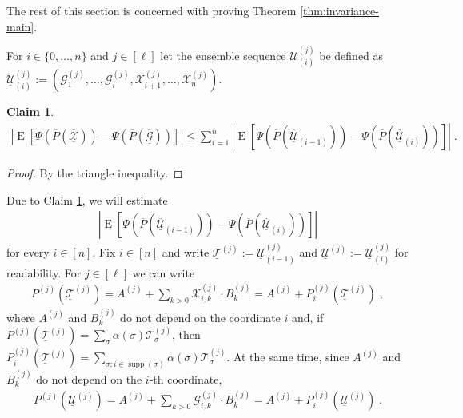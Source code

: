 \documentclass{daj}
\newcommand{\1}{\mathbbm{1}}
\theoremstyle{plain}
\newtheorem{claim}[theorem]{Claim}
\theoremstyle{definition}
\DeclareMathOperator*{\EE}{E}
\DeclareMathOperator*{\supp}{supp}
\begin{document}
The rest of this section is concerned with proving Theorem 
\ref{thm:invariance-main}.

For $i \in \{0, \ldots, n\}$ and $j \in [\ell]$ let the ensemble sequence 
$\underline{\mathcal{U}}_{(i)}^{(j)}$ be
defined as $\underline{\mathcal{U}}_{(i)}^{(j)} := 
(\mathcal{G}_1^{(j)}, \ldots, \mathcal{G}_i^{(j)}, 
\mathcal{X}_{i+1}^{(j)}, \ldots, \mathcal{X}_n^{(j)})$.

\begin{claim}
\label{cl:invariance-triangle-inequality}
\begin{align*}
\left| \EE \left[
	\Psi(\overline{P}(\overline{\underline{\mathcal{X}}}))
	- \Psi(\overline{P}(\overline{\underline{\mathcal{G}}}))
	\right] \right|
  \le
\sum_{i=1}^n \left| \EE \left[
	\Psi(\overline{P}(\overline{\underline{\mathcal{U}}}_{(i-1)}))
	- \Psi(\overline{P}(\overline{\underline{\mathcal{U}}}_{(i)}))
	\right] \right| \; .
\end{align*}
\end{claim}

\begin{proof}
By the triangle inequality.
\end{proof}

Due to Claim 
\ref{cl:invariance-triangle-inequality}, we will estimate
\begin{align*}
\left| \EE \left[
	\Psi(\overline{P}(\overline{\underline{\mathcal{U}}}_{(i-1)}))
	- \Psi(\overline{P}(\overline{\underline{\mathcal{U}}}_{(i)}))
	\right] \right| 
\end{align*}
for every $i \in [n]$. Fix $i \in [n]$ and write
$\underline{\mathcal{T}}^{(j)} := \underline{\mathcal{U}}_{(i-1)}^{(j)}$ and
$\underline{\mathcal{U}}^{(j)} := \underline{\mathcal{U}}_{(i)}^{(j)}$ for 
readability.
For $j \in [\ell]$ we can write
\begin{align}
\label{eq:62a}
  P^{(j)}(\underline{\mathcal{T}}^{(j)}) =
  A^{(j)} + \sum_{k>0} \mathcal{X}_{i,k}^{(j)} \cdot B^{(j)}_k =
  A^{(j)} + P_i^{(j)}(\underline{\mathcal{T}}^{(j)}) \; ,
\end{align}
where $A^{(j)}$ and $B^{(j)}_k$ do not depend on the coordinate $i$
and, if $P^{(j)}(\underline{\mathcal{T}}^{(j)}) = 
\sum_\sigma \alpha(\sigma) \mathcal{T}_\sigma^{(j)}$,
then $P_i^{(j)}(\underline{\mathcal{T}}^{(j)}) = \sum_{\sigma: i \in \supp(\sigma)} 
\alpha(\sigma) \mathcal{T}_\sigma^{(j)}$.
At the same time, since $A^{(j)}$ and $B_k^{(j)}$ do not depend on the 
$i$-th coordinate,
\begin{align*}
  P^{(j)}(\underline{\mathcal{U}}^{(j)}) =
  A^{(j)} + \sum_{k>0} \mathcal{G}_{i,k}^{(j)} \cdot B^{(j)}_k =
  A^{(j)} + P_i^{(j)}(\underline{\mathcal{U}}^{(j)})
  \; .
\end{align*}
\end{document}

